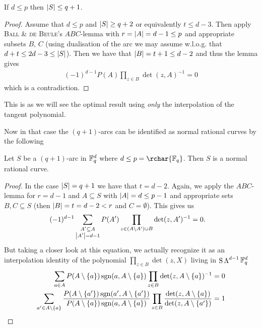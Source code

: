 \documentclass[a4paper]{article}
\begin{document}
\begin{corollary}
  If $d\leq p$ then $\left|S\right|\leq q+1$.
\end{corollary}

\begin{proof}
  Assume that $d\leq p$ and $\left|S\right|\geq q+2$ or equivalently $t\leq
  d-3$. Then apply \textsc{Ball \& de Beule}'s $ABC$-lemma with
  $r=\left|A\right|=d-1\leq p$ and appropriate subsets $B$, $C$ (using dualisation of
  the arc we may assume w.l.o.g. that $d+t\leq 2d-3\leq\left|S\right|$). Then
  we have that $\left|B\right|=t+1\leq d-2$ and thus the lemma gives
  \begin{align*}
    (-1)^{d-1}P(A)\prod_{z\in B}{\det(z,A)^{-1}}=0
  \end{align*}
  which is a contradiction.
\end{proof}

\begin{remark}
  This is as we will see the optimal result using \emph{only} the interpolation
  of the tangent polynomial.
\end{remark}

Now in that case the $(q+1)$-arcs can be identified as normal rational
curves by the following 

\begin{corollary}
  Let $S$ be a $(q+1)$-arc in $\mathbb{F}_{q}^d$ where $d\leq
  p=\rchar{\field{q}}$. Then $S$ is a normal rational curve.
\end{corollary}

\begin{proof}
  In the case $\left|S\right|=q+1$ we have that $t=d-2$.
  Again, we apply the $ABC$-lemma for $r=d-1$ and $A\subseteq S$ with
  $\left|A\right|=d\leq p-1$ and appropriate sets $B,C\subseteq S$ (then
  $\left|B\right|=t=d-2<r$ and $C=\emptyset$). This gives us
  \begin{align*}
    (-1)^{d-1}\sum_{\substack{A'\subseteq A\\
        \left|A'\right|=d-1}}{P(A')\prod_{z\in (A\setminus A')\cup
        B}{\det(z,A')^{-1}}} &= 0\text{.}
  \end{align*}
  But taking a closer look at this equation, we actually recognize it as
  an interpolation identity of the polynomial $\prod_{z\in B}{\det(z,X)}$
  living in $\mathop\mathrm{S}{\mathop\mathrm{\Lambda}^{d-1}{\mathbb{F}_{q}^d}}$
  \begin{align*}
    \sum_{a\in A}{P(A\setminus\{a\})\mathop\mathrm{sgn}(a,A\setminus\{a\})\prod_{z\in
        B}{\det(z,A\setminus\{a\})^{-1}}} &= 0\\
    \sum_{a'\in
      A\setminus\{a\}}{\frac{P(A\setminus\{a'\})\mathop\mathrm{sgn}(a',A\setminus\{a'\})}{P(A\setminus\{a\})\mathop\mathrm{sgn}(a,A\setminus\{a\})}\prod_{z\in
        B}{\frac{\det(z,A\setminus\{a\})}{\det(z,A\setminus\{a'\})}}} &= 1 
  \end{align*}


\end{proof}
\end{document}
